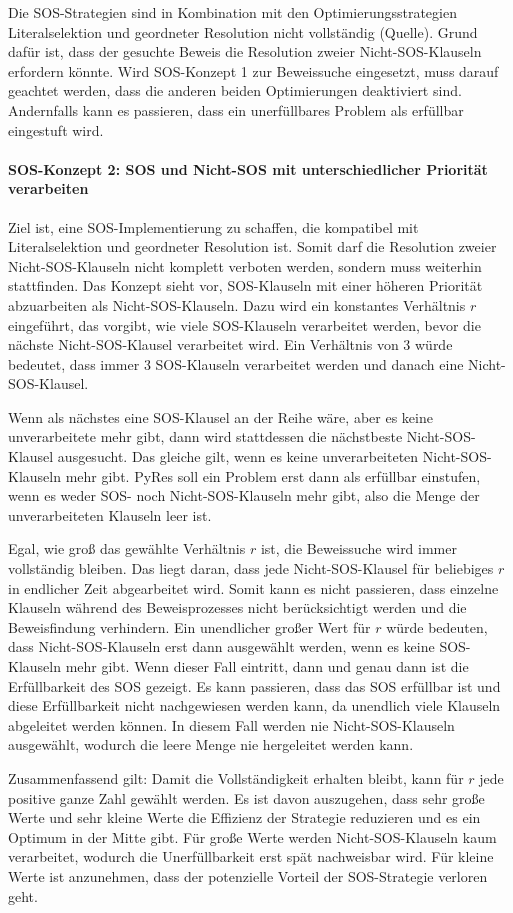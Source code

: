 Die SOS-Strategien sind in Kombination mit den Optimierungsstrategien Literalselektion und geordneter Resolution nicht vollständig (Quelle). Grund dafür ist, dass der gesuchte Beweis die Resolution zweier Nicht-SOS-Klauseln erfordern könnte. Wird SOS-Konzept 1 zur Beweissuche eingesetzt, muss darauf geachtet werden, dass die anderen beiden Optimierungen deaktiviert sind. Andernfalls kann es passieren, dass ein unerfüllbares Problem als erfüllbar eingestuft wird. 

\paragraph{SOS-Konzept 2: SOS und Nicht-SOS mit unterschiedlicher Priorität verarbeiten}

Ziel ist, eine SOS-Implementierung zu schaffen, die kompatibel mit Literalselektion und geordneter Resolution ist. Somit darf die Resolution zweier Nicht-SOS-Klauseln nicht komplett verboten werden, sondern muss weiterhin stattfinden. Das Konzept sieht vor, SOS-Klauseln mit einer höheren Priorität abzuarbeiten als Nicht-SOS-Klauseln. Dazu wird ein konstantes Verhältnis $r$ eingeführt, das vorgibt, wie viele SOS-Klauseln verarbeitet werden, bevor die nächste Nicht-SOS-Klausel verarbeitet wird. Ein Verhältnis von 3 würde bedeutet, dass immer 3 SOS-Klauseln verarbeitet werden und danach eine Nicht-SOS-Klausel.

Wenn als nächstes eine SOS-Klausel an der Reihe wäre, aber es keine unverarbeitete mehr gibt, dann wird stattdessen die nächstbeste Nicht-SOS-Klausel ausgesucht. Das gleiche gilt, wenn es keine unverarbeiteten Nicht-SOS-Klauseln mehr gibt. PyRes soll ein Problem erst dann als erfüllbar einstufen, wenn es weder SOS- noch Nicht-SOS-Klauseln mehr gibt, also die Menge der unverarbeiteten Klauseln leer ist.


Egal, wie groß das gewählte Verhältnis $r$ ist, die Beweissuche wird immer vollständig bleiben. Das liegt daran, dass jede Nicht-SOS-Klausel für beliebiges $r$ in endlicher Zeit abgearbeitet wird. Somit kann es nicht passieren, dass einzelne Klauseln während des Beweisprozesses nicht berücksichtigt werden und die Beweisfindung verhindern.
Ein unendlicher großer Wert für $r$ würde bedeuten, dass Nicht-SOS-Klauseln erst dann ausgewählt werden, wenn es keine SOS-Klauseln mehr gibt. Wenn dieser Fall eintritt, dann und genau dann ist die Erfüllbarkeit des SOS gezeigt. Es kann passieren, dass das SOS erfüllbar ist und diese Erfüllbarkeit nicht nachgewiesen werden kann, da unendlich viele Klauseln abgeleitet werden können. In diesem Fall werden nie Nicht-SOS-Klauseln ausgewählt, wodurch die leere Menge nie hergeleitet werden kann. 

Zusammenfassend gilt: Damit die Vollständigkeit erhalten bleibt, kann für $r$ jede positive ganze Zahl gewählt werden. Es ist davon auszugehen, dass sehr große Werte und sehr kleine Werte die Effizienz der Strategie reduzieren und es ein Optimum in der Mitte gibt. Für große Werte werden Nicht-SOS-Klauseln kaum verarbeitet, wodurch die Unerfüllbarkeit erst spät nachweisbar wird. Für kleine Werte ist anzunehmen, dass der potenzielle Vorteil der SOS-Strategie verloren geht.
